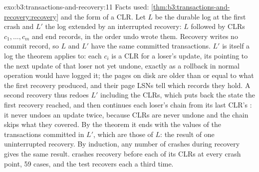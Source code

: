 \begin{solution}{exo:b3:transactions-and-recovery:11}
Facts used: \cref{thm:b3:transactions-and-recovery:recovery} and the form of a CLR. Let $L$ be the durable log at the first crash and $L'$ the log extended by an interrupted recovery: $L$ followed by CLRs $c_1, \ldots, c_m$ and end records, in the order undo wrote them. Recovery writes no commit record, so $L$ and $L'$ have the same committed transactions. $L'$ is itself a log the theorem applies to: each $c_i$ is a CLR for a loser's update, its  pointing to the next update of that loser not yet undone, exactly as a rollback in normal operation would have logged it; the pages on disk are older than or equal to what the first recovery produced, and their page LSNs tell which records they hold. A second recovery thus redoes $L'$ including the CLRs, which puts back the state the first recovery reached, and then continues each loser's chain from its last CLR's : it never undoes an update twice, because CLRs are never undone and the chain skips what they covered. By the theorem it ends with the values of the transactions committed in $L'$, which are those of $L$: the result of one uninterrupted recovery. By induction, any number of crashes during recovery gives the same result.  crashes recovery before each of its CLRs at every crash point, 59 cases, and the test recovers each a third time.
\end{solution}

